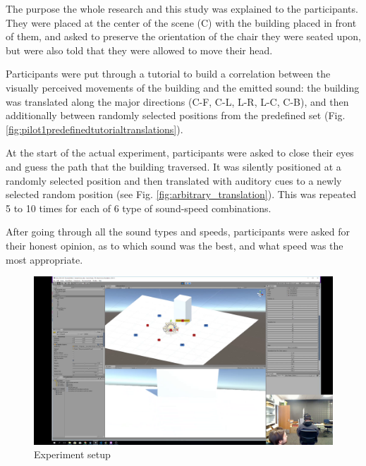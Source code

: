 The purpose the whole research and this study was explained to the participants. They were placed at the center of the scene (C) with the building placed in front of them, and asked to preserve the orientation of the chair they were seated upon, but were also told that they were allowed to move their head.

Participants were put through a tutorial to build a correlation between the visually perceived movements of the building and the emitted sound: the building was translated along the major directions (C-F, C-L, L-R, L-C, C-B), and then additionally between randomly selected positions from the predefined set (Fig. \ref{fig:pilot1predefinedtutorialtranslations}).

At the start of the actual experiment, participants were asked to close their eyes and guess the path that the building traversed. It was silently positioned at a randomly selected position and then translated with auditory cues to a newly selected random position (see Fig. \ref{fig:arbitrary_translation}). This was repeated 5 to 10 times for each of 6 type of sound-speed combinations.

After going through all the sound types and speeds, participants were asked for their honest opinion, as to which sound was the best, and what speed was the most appropriate.

\begin{figure}
	\centering
	\includegraphics[width=0.7\linewidth]{figures/placeholders/pilot1_experiment_setup.png}
	\caption{Experiment setup}
	\label{fig:clipimage001}
\end{figure}

